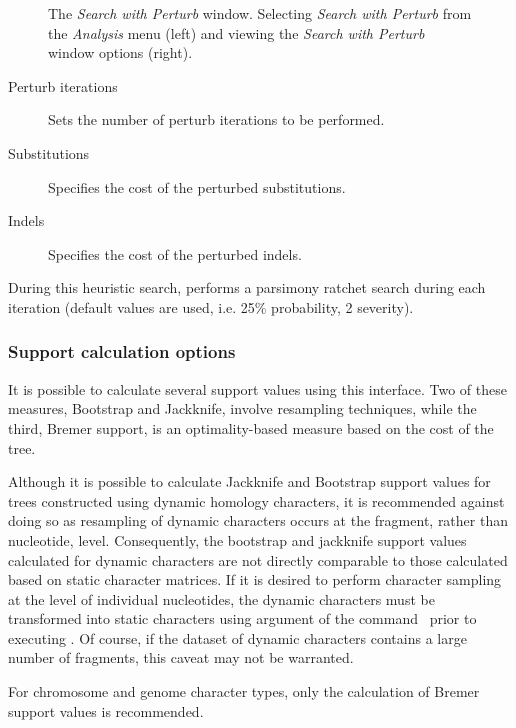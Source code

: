{\begin{figure}
\begin{minipage}[c]{0.52\textwidth}
\end{minipage} 
\caption{The \emph{Search with Perturb} window. Selecting \emph{Search with 
Perturb} from the \emph{Analysis} menu (left) and viewing the \emph{Search 
with Perturb} window options (right).}
\label{fig:search_with_perturb_window}
\end{figure}

\begin{description}
\item[Perturb iterations] Sets the number of perturb iterations to be performed.
\item[Substitutions] Specifies the cost of the perturbed substitutions.
\item[Indels] Specifies the cost of the perturbed indels.
\end{description}

During this heuristic search, \poy performs a parsimony ratchet search during 
each iteration (default values are used, i.e. 25\% probability, 2 severity).

\subsubsection{Support calculation options}

It is possible to calculate several support values using this
interface.  Two of these measures, Bootstrap and Jackknife, involve
resampling techniques, while the third, Bremer support, is an
optimality-based measure based on the cost of the tree.

Although it is possible to calculate Jackknife and Bootstrap support
values for trees constructed using dynamic homology characters, it
is recommended against doing so as resampling of dynamic characters
occurs at the fragment, rather than nucleotide, level. Consequently,
the bootstrap and jackknife support values calculated for dynamic
characters are not directly comparable to those calculated based
on static character matrices. If it is desired to perform character
sampling at the level of individual nucleotides, the dynamic
characters must be transformed into static characters using
 argument of the command~
prior to executing .  Of course, if
the dataset of dynamic characters contains a large number of
fragments, this caveat may not be warranted.

For chromosome and genome character types, only the calculation of
Bremer support values is recommended.

}
